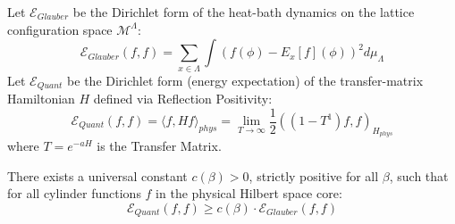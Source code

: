 \begin{theorem}
\label{thm:dirichlet_comparison_ch2}
Let $\mathcal{E}_{Glauber}$ be the Dirichlet form of the heat-bath dynamics on the lattice configuration space $\mathcal{M}^\Lambda$:
\[ \mathcal{E}_{Glauber}(f, f) = \sum_{x \in \Lambda} \int (f(\phi) - E_x[f](\phi))^2 d\mu_\Lambda \]
Let $\mathcal{E}_{Quant}$ be the Dirichlet form (energy expectation) of the transfer-matrix Hamiltonian $H$ defined via Reflection Positivity:
\[ \mathcal{E}_{Quant}(f, f) = \langle f, H f \rangle_{phys} = \lim_{T \to \infty} \frac{1}{2} ( (1 - T^{1}) f, f )_{H_{phys}} \]
where $T = e^{-aH}$ is the Transfer Matrix.

There exists a universal constant $c(\beta) > 0$, strictly positive for all $\beta$, such that for all cylinder functions $f$ in the physical Hilbert space core:
\[ \mathcal{E}_{Quant}(f, f) \ge c(\beta) \cdot \mathcal{E}_{Glauber}(f, f) \]
\end{theorem}

